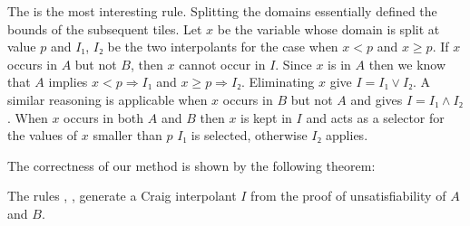 The \spltI is the most interesting rule.
Splitting the domains essentially defined the bounds of the subsequent tiles.
Let $x$ be the variable whose domain is split at value $p$ and $I₁$, $I₂$ be the two interpolants for the case when $x < p$ and $x ≥ p$.
If $x$ occurs in $A$ but not $B$, then $x$ cannot occur in $I$.
Since $x$ is in $A$ then we know that $A$ implies $x < p ⇒ I₁$ and $x ≥ p ⇒ I₂$.
Eliminating $x$ give $I = I₁ ∨ I₂$.
A similar reasoning is applicable when $x$ occurs in $B$ but not $A$ and gives $I = I₁ ∧ I₂$.
When $x$ occurs in both $A$ and $B$ then $x$ is kept in $I$ and acts as a selector for the values of $x$ smaller than $p$ $I₁$ is selected, otherwise $I₂$ applies.

The correctness of our method is shown by the following theorem:
\begin{theorem}
The rules \spltI, \thLemI, \weakenI generate a Craig interpolant $I$ from the proof of unsatisfiability of $A$ and $B$.
\label{thm:sound}
\end{theorem}
